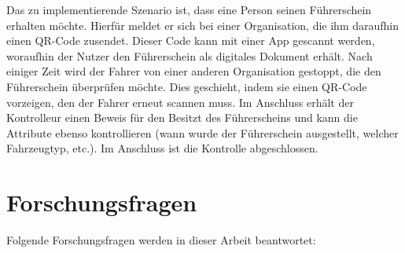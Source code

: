 Das zu implementierende Szenario ist, dass eine Person seinen Führerschein erhalten möchte. Hierfür meldet er sich bei einer Organisation, die ihm daraufhin einen QR-Code zusendet. Dieser Code kann mit einer App gescannt werden, woraufhin der Nutzer den Führerschein als digitales Dokument erhält. Nach einiger Zeit wird der Fahrer von einer anderen Organisation gestoppt, die den Führerschein überprüfen möchte. Dies geschieht, indem sie einen QR-Code vorzeigen, den der Fahrer erneut scannen muss. Im Anschluss erhält der Kontrolleur einen Beweis für den Besitzt des Führerscheins und kann die Attribute ebenso kontrollieren (wann wurde der Führerschein ausgestellt, welcher Fahrzeugtyp, etc.). Im Anschluss ist die Kontrolle abgeschlossen.

\section{Forschungsfragen}
\label{forschungsfragen}
Folgende Forschungsfragen werden in dieser Arbeit beantwortet:
